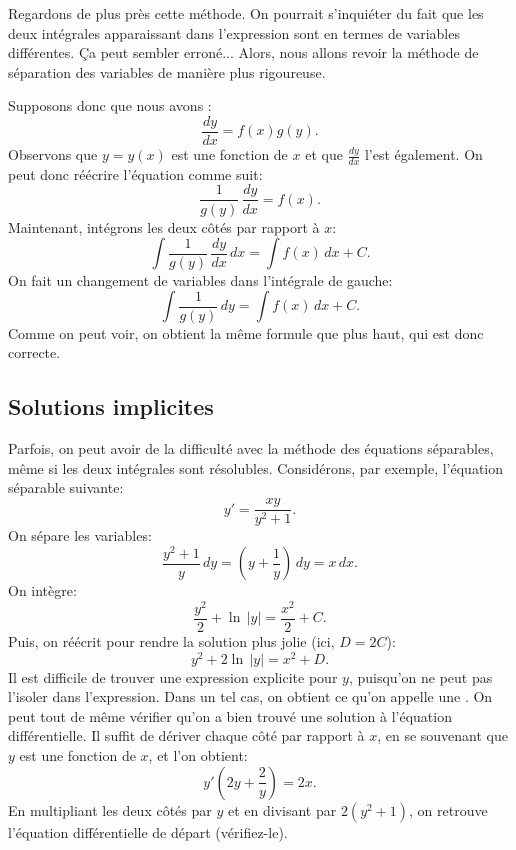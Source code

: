 Regardons de plus près cette méthode.  On pourrait s'inquiéter du fait que les deux intégrales apparaissant dans l'expression sont en termes de variables différentes.  Ça peut sembler erroné... Alors, nous allons revoir la méthode de séparation des variables de manière plus rigoureuse.

Supposons donc que nous avons :
\begin{equation*}
	\frac{dy}{dx} = f(x)g(y) .
\end{equation*}
Observons que $y = y(x)$ est une fonction de $x$ et que
$\frac{dy}{dx}$ l'est également.  On peut donc réécrire l'équation comme suit:
\begin{equation*}
	\frac{1}{g(y)}\,\frac{dy}{dx} = f(x) .
\end{equation*}
Maintenant, intégrons les deux côtés par rapport à $x$:
\begin{equation*}
	\int \frac{1}{g(y)}\,\frac{dy}{dx} \,dx = \int f(x) \,dx + C .
\end{equation*}
On fait un changement de variables dans l'intégrale de gauche:
\begin{equation*}
	\int \frac{1}{g(y)}\,dy = \int f(x) \,dx + C .
\end{equation*}
Comme on peut voir, on obtient la même formule que plus haut, qui est donc correcte.




\subsection{Solutions implicites}

Parfois, on peut avoir de la difficulté avec la méthode des équations séparables,
même si les deux intégrales sont résolubles.
Considérons, par exemple, l'équation séparable suivante:
\begin{equation*}
	y' = \frac{xy}{y^2+1} .
\end{equation*}
On sépare les variables:
\begin{equation*}
	\frac{y^2+1}{y}\,dy = \left(y+\frac{1}{y}\right)\,dy = x\,dx .
\end{equation*}
On intègre:
\begin{equation*}
	\frac{y^2}{2} + \ln \, \lvert y \rvert = \frac{x^2}{2} + C.
\end{equation*}
Puis, on réécrit pour rendre la solution plus jolie (ici, $D = 2C$):
\begin{equation*}
	y^2 + 2 \ln \, \lvert y\rvert = x^2 + D .
\end{equation*}
Il est difficile de trouver une expression explicite pour $y$, puisqu'on ne peut pas l'isoler dans l'expression.
Dans un tel cas, on obtient ce qu'on appelle une
\emph{}.
On peut tout de même vérifier qu'on a bien trouvé une solution à l'équation différentielle.
Il suffit de dériver chaque côté par rapport à $x$, en se souvenant que $y$ est une fonction de $x$, et l'on obtient:
\begin{equation*}
	y'\left(2y + \frac{2}{y}\right) = 2x .
\end{equation*}
En multipliant les deux côtés par $y$ et en divisant par $2(y^2+1)$, on retrouve l'équation différentielle de départ (vérifiez-le).

